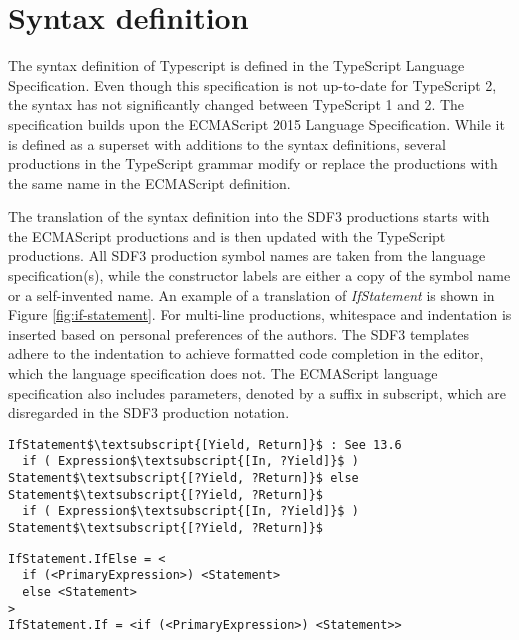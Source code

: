 \section{Syntax definition}
\label{sec:syntax}
The syntax definition of Typescript is defined in the TypeScript Language Specification.
Even though this specification is not up-to-date for TypeScript 2, the syntax has not significantly changed between TypeScript 1 and 2.
The specification builds upon the ECMAScript 2015 Language Specification.
While it is defined as a superset with additions to the syntax definitions, several productions in the TypeScript grammar modify or replace the productions with the same name in the ECMAScript definition.

The translation of the syntax definition into the SDF3\citep{Vollebregt:2012:DST:2427048.2427056} productions starts with the ECMAScript productions and is then updated with the TypeScript productions.
All SDF3 production symbol names are taken from the language specification(s), while the constructor labels are either a copy of the symbol name or a self-invented name.
An example of a translation of \textit{IfStatement} is shown in Figure \ref{fig:if-statement}.
For multi-line productions, whitespace and indentation is inserted based on personal preferences of the authors.
The SDF3 templates adhere to the indentation to achieve formatted code completion in the editor, which the language specification does not.
The ECMAScript language specification also includes parameters, denoted by a suffix in subscript, which are disregarded in the SDF3 production notation.

\begin{figure*}
  \begin{lstlisting}[caption=Definition of \textit{IfStatement} in the ECMAScript language specification,mathescape]
IfStatement$\textsubscript{[Yield, Return]}$ : See 13.6
  if ( Expression$\textsubscript{[In, ?Yield]}$ ) Statement$\textsubscript{[?Yield, ?Return]}$ else Statement$\textsubscript{[?Yield, ?Return]}$
  if ( Expression$\textsubscript{[In, ?Yield]}$ ) Statement$\textsubscript{[?Yield, ?Return]}$
  \end{lstlisting}
  \begin{lstlisting}[caption=Definition of \textit{IfStatement} in SDF3 production notation]
IfStatement.IfElse = <
  if (<PrimaryExpression>) <Statement>
  else <Statement>
>
IfStatement.If = <if (<PrimaryExpression>) <Statement>>
  \end{lstlisting}
  \caption{The translation of \textit{IfStatement} from the ECMAScript language specification to SDF3 production notation.}
  \label{fig:if-statement}
\end{figure*}

